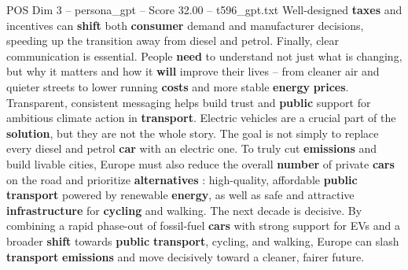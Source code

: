 \begin{textsample}{POS Dim 3 – persona\_gpt – Score 32.00 – t596\_gpt.txt}
Well-designed \textbf{taxes} and incentives can \textbf{shift} both \textbf{consumer} demand and manufacturer decisions, speeding up the transition away from diesel and petrol.
Finally, clear communication is essential.
People \textbf{need} to understand not just what is changing, but why it matters and how it \textbf{will} improve their lives – from cleaner air and quieter streets to lower running \textbf{costs} and more stable \textbf{energy} \textbf{prices}.
Transparent, consistent messaging helps build trust and \textbf{public} support for ambitious climate action in \textbf{transport}.
Electric vehicles are a crucial part of the \textbf{solution}, but they are not the whole story.
The goal is not simply to replace every diesel and petrol \textbf{car} with an electric one.
To truly cut \textbf{emissions} and build livable cities, Europe must also reduce the overall \textbf{number} of private \textbf{cars} on the road and prioritize \textbf{alternatives} : high-quality, affordable \textbf{public} \textbf{transport} powered by renewable \textbf{energy}, as well as safe and attractive \textbf{infrastructure} for \textbf{cycling} and walking.
The next decade is decisive.
By combining a rapid phase-out of fossil-fuel \textbf{cars} with strong support for EVs and a broader \textbf{shift} towards \textbf{public} \textbf{transport}, cycling, and walking, Europe can slash \textbf{transport} \textbf{emissions} and move decisively toward a cleaner, fairer future.

\end{textsample}
